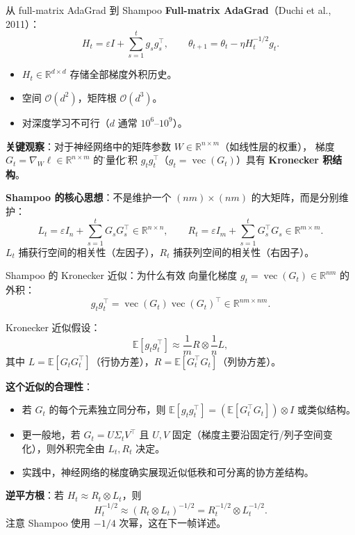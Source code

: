 \documentclass[aspectratio=169,10pt]{ctexbeamer}
\newcommand{\R}{\mathbb{R}}
\newcommand{\E}{\mathbb{E}}
\newcommand{\vect}{\operatorname{vec}}
\newcommand{\eps}{\varepsilon}
\newcommand{\grad}{\nabla}
\begin{document}
\begin{frame}{从 full-matrix AdaGrad 到 Shampoo}
\textbf{Full-matrix AdaGrad}（Duchi et al., 2011）：
\[
  H_t=\eps I+\sum_{s=1}^t g_s g_s^\top,\qquad
  \theta_{t+1}=\theta_t-\eta H_t^{-1/2}g_t.
\]
\begin{itemize}
  \item $H_t\in\R^{d\times d}$ 存储全部梯度外积历史。
  \item 空间 $\mathcal{O}(d^2)$，矩阵根 $\mathcal{O}(d^3)$。
  \item 对深度学习不可行（$d$ 通常 $10^6$--$10^9$）。
\end{itemize}

\vspace{.25cm}
\textbf{关键观察}：对于神经网络中的矩阵参数 $W\in\R^{n\times m}$（如线性层的权重），
梯度 $G_t=\grad_W\ell\in\R^{n\times m}$ 的\"向量化\"外积 $g_t g_t^\top$（$g_t=\vect(G_t)$）具有
\textbf{Kronecker 积结构}。

\vspace{.25cm}
\textbf{Shampoo 的核心思想}：不是维护一个 $(nm)\times(nm)$ 的大矩阵，而是分别维护：
\[
  L_t=\eps I_n+\sum_{s=1}^t G_s G_s^\top\in\R^{n\times n},\qquad
  R_t=\eps I_m+\sum_{s=1}^t G_s^\top G_s\in\R^{m\times m}.
\]
$L_t$ 捕获行空间的相关性（左因子），$R_t$ 捕获列空间的相关性（右因子）。
\end{frame}

\begin{frame}{Shampoo 的 Kronecker 近似：为什么有效}
向量化梯度 $g_t=\vect(G_t)\in\R^{nm}$ 的外积：
\[
  g_t g_t^\top=\vect(G_t)\vect(G_t)^\top\in\R^{nm\times nm}.
\]

Kronecker 近似假设：
\[
  \E[g_t g_t^\top]\approx \frac{1}{m}R\otimes\frac{1}{n}L,
\]
其中 $L=\E[G_t G_t^\top]$（行协方差），$R=\E[G_t^\top G_t]$（列协方差）。

\vspace{.25cm}
\textbf{这个近似的合理性}：
\begin{itemize}
  \item 若 $G_t$ 的每个元素独立同分布，则 $\E[g_t g_t^\top]=(\E[G_t^\top G_t])\otimes I$ 或类似结构。
  \item 更一般地，若 $G_t=U\Sigma_t V^\top$ 且 $U,V$ 固定（梯度主要沿固定行/列子空间变化），则外积完全由 $L_t,R_t$ 决定。
  \item 实践中，神经网络的梯度确实展现近似低秩和可分离的协方差结构。
\end{itemize}

\vspace{.25cm}
\textbf{逆平方根}：若 $H_t\approx R_t\otimes L_t$，则
\[
  H_t^{-1/2}\approx (R_t\otimes L_t)^{-1/2}=R_t^{-1/2}\otimes L_t^{-1/2}.
\]
注意 Shampoo 使用 $-1/4$ 次幂，这在下一帧详述。
\end{frame}
\end{document}
